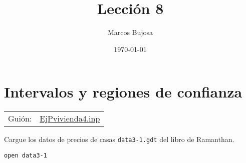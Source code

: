 \documentclass[11pt]{article}
\author{Marcos Bujosa}
\date{\today}
\title{Lección 8}
\begin{document}
\maketitle
\tableofcontents

\clearpage

\section{Intervalos y regiones de confianza}
\label{sec:org79452d8}
\begin{center}
\begin{tabular}{ll}
Guión: & \href{https://github.com/mbujosab/Ectr/tree/master/Practicas/Gretl/scripts/EjPvivienda4.inp}{EjPvivienda4.inp}\\[0pt]
\end{tabular}
\end{center}

Cargue los datos de precios de casas \texttt{data3-1.gdt} del libro de
Ramanthan.
\begin{verbatim}
open data3-1
\end{verbatim}
\end{document}
